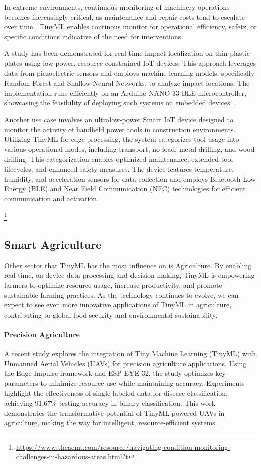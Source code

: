 \documentclass[twocolumn]{article}
\begin{document}
In extreme environments, continuous monitoring of machinery operations becomes increasingly critical, as maintenance and repair costs tend to escalate over time . TinyML enables continous monitor for operational efficiency, safetz, or specific conditions indicative of the need for interventions.

A study has been demonstrated for real-time impact localization on thin plastic plates using low-power, resource-constrained IoT devices. This approach leverages data from piezoelectric sensors and employs machine learning models, specifically Random Forest and Shallow Neural Networks, to analyze impact locations. The implementation runs efficiently on an Arduino NANO 33 BLE microcontroller, showcasing the feasibility of deploying such systems on embedded devices. \cite{noauthor_smart_nodate}.


Another use case involves an ultralow-power Smart IoT device designed to monitor the activity of handheld power tools in construction environments. Utilizing TinyML for edge processing, the system categorizes tool usage into various operational modes, including transport, no-load, metal drilling, and wood drilling. This categorization enables optimized maintenance, extended tool lifecycles, and enhanced safety measures. The device features temperature, humidity, and acceleration sensors for data collection and employs Bluetooth Low Energy (BLE) and Near Field Communication (NFC) technologies for efficient communication and activation. \cite{giordano_design_2022}

\footnote{\url{https://www.theaemt.com/resource/navigating-condition-monitoring-challenges-in-hazardous-areas.html?t}}

\subsection{Smart Agriculture}
Other sector that TinyML has the most influence on is Agriculture.  By enabling real-time, on-device data processing and decision-making, TinyML is empowering farmers to optimize resource usage, increase productivity, and promote sustainable farming practices. As the technology continues to evolve, we can expect to see even more innovative applications of TinyML in agriculture, contributing to global food security and environmental sustainability.


\paragraph{Precision Agriculture}
A recent study explores the integration of Tiny Machine Learning (TinyML) with Unmanned Aerial Vehicles (UAVs) for precision agriculture applications. Using the Edge Impulse framework and ESP EYE 32, the study optimizes key parameters to minimize resource use while maintaining accuracy. Experiments highlight the effectiveness of single-labeled data for disease classification, achieving 91.67\% testing accuracy in binary classification. This work demonstrates the transformative potential of TinyML-powered UAVs in agriculture, making the way for intelligent, resource-efficient systems. \cite{annadata_tinyml_2024}
\end{document}
